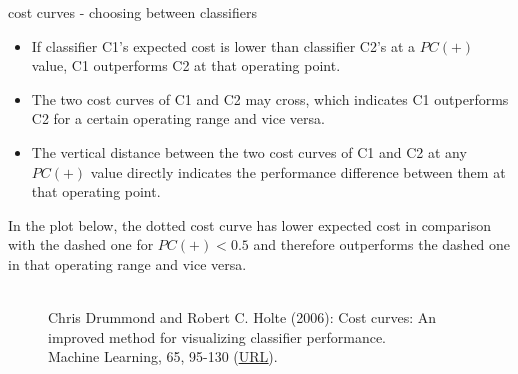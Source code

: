 
\begin{vbframe}{cost curves - choosing between classifiers}
  \begin{itemize}
    \item If classifier C1's expected cost is lower than classifier C2's at a $PC(+)$ value, C1 outperforms C2 at that operating point.
    \item The two cost curves of C1 and C2 may cross, which indicates C1 outperforms C2 for a certain operating range and vice versa.
    \item The vertical distance between the two cost curves of C1 and C2 at any $PC(+)$ value directly indicates the performance difference between them at that operating point.
  \end{itemize}
  \pagebreak
  In the plot below, the dotted cost curve has lower expected cost in comparison with the dashed one for $PC(+) < 0.5$ and therefore outperforms the dashed one in that operating range and vice versa.
  \begin{figure}
    \centering
    \tiny
    \\Chris Drummond and Robert C. Holte (2006): Cost curves: An improved
    method for visualizing classifier performance. \\Machine Learning, 65, 95-130
    (\href{https://www.semanticscholar.org/paper/Cost-curves\%3A-An-improved-method-for  -visualizing-Drummond-Holte/71708ce984e0896e7383435913547e770572410e}
    {\underline{URL}}).
  \end{figure}
  
\end{vbframe}


